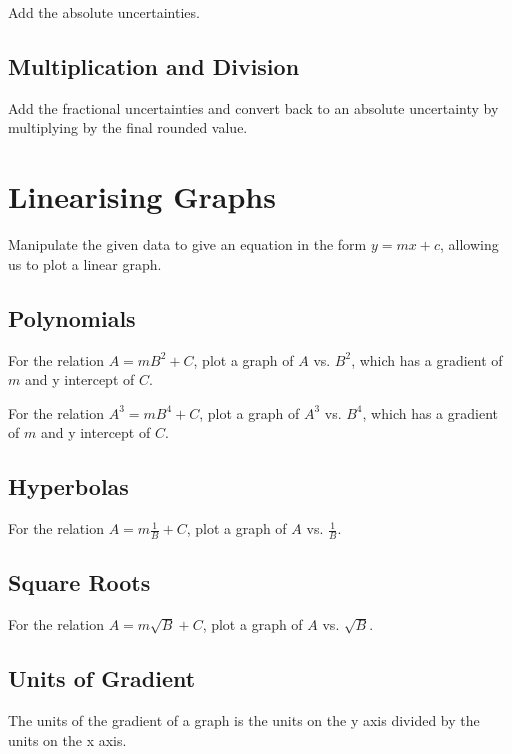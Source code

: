 \documentclass[a4paper,11pt]{article}
\begin{document}
Add the absolute uncertainties.


\subsection{Multiplication and Division}

Add the fractional uncertainties and convert back to an absolute uncertainty by
multiplying by the final rounded value.




\section{Linearising Graphs}

Manipulate the given data to give an equation in the form $y = mx + c$, allowing
us to plot a linear graph.


\subsection{Polynomials}

For the relation $A = mB^2 + C$, plot a graph of $A$ vs. $B^2$, which has a
gradient of $m$ and y intercept of $C$.

For the relation $A^3 = mB^4 + C$, plot a graph of $A^3$ vs. $B^4$, which has a
gradient of $m$ and y intercept of $C$.


\subsection{Hyperbolas}

For the relation $A = m \frac{1}{B} + C$, plot a graph of $A$ vs. $\frac{1}{B}$.


\subsection{Square Roots}

For the relation $A = m \sqrt{B} + C$, plot a graph of $A$ vs. $\sqrt{B}$.


\subsection{Units of Gradient}

The units of the gradient of a graph is the units on the y axis divided by the
units on the x axis.
\end{document}
